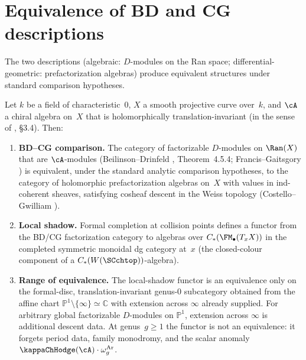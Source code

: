 \section{Equivalence of BD and CG descriptions}
\label{sec:BD-CG-equivalence}

The two descriptions (algebraic: $D$-modules on the Ran space;
differential-geometric: prefactorization algebras) produce
equivalent structures under standard comparison hypotheses.

\begin{theorem}
\label{thm:BD-CG-equivalence}
Let $k$ be a field of characteristic~$0$, $X$ a smooth projective
curve over~$k$, and $\cA$ a chiral algebra on~$X$ that is
holomorphically translation-invariant (in the sense of
\textup{\cite{BD04}, \S3.4}). Then:
\begin{enumerate}[label=\textup{(\roman*)}]
\item \textbf{BD--CG comparison.} The category of
 factorizable $D$-modules on $\Ran(X)$ that are $\cA$-modules
 \textup{(}Beilinson--Drinfeld \textup{\cite{BD04}},
 Theorem~\textup{4.5.4; Francis--Gaitsgory \cite{FG12})}
 is equivalent, under the standard analytic comparison hypotheses,
 to the category of holomorphic
 prefactorization algebras on~$X$ with values in ind-coherent
 sheaves, satisfying cosheaf descent in the Weiss topology
 \textup{(}Costello--Gwilliam \textup{\cite{CG17})}.

\item \textbf{Local shadow.} Formal completion at collision points
 defines a functor from the BD/CG factorization category to algebras
 over
 $C_\ast(\FM_\bullet(T_xX))$ in the completed symmetric monoidal dg
 category at~$x$ \textup{(}the closed-colour component of
 a $C_\ast(W(\SCchtop))$-algebra\textup{)}.

\item \textbf{Range of equivalence.} The local-shadow functor is an
 equivalence only on the formal-disc, translation-invariant
 genus-$0$ subcategory obtained from the affine chart
 $\mathbb P^1\setminus\{\infty\}\simeq \mathbb C$ with extension
 across $\infty$ already supplied. For arbitrary global
 factorizable $D$-modules on $\mathbb P^1$, extension across
 $\infty$ is additional descent data. At genus~$g\ge 1$ the
 functor is not an equivalence: it forgets period data, family
 monodromy, and the scalar anomaly $\kappaChHodge(\cA)\cdot\omega_g^{\mathrm{Ar}}$.
\end{enumerate}
\end{theorem}

